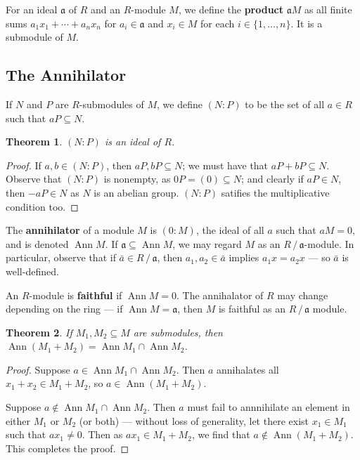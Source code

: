 \documentclass[11pt]{article}
\newtheorem{theorem}{Theorem}
\newcommand{\Ann}{\operatorname{Ann}}
\begin{document}
For an ideal $\mathfrak{a}$ of $R$ and an $R$-module $M$, we define the \textbf{product} $\mathfrak{a} M$ as all finite sums $a_{1}x_{1} + \cdots + a_{n}x_{n}$ for $a_{i} \in \mathfrak{a}$ and $x_{i} \in M$  for each $i \in \{ 1, \ldots, n \}$. It is a submodule of $M$.


\subsection{The Annihilator}

If $N$ and $P$ are $R$-submodules of $M$, we define $(N : P)$ to be the set of all $a \in R$ such that $aP \subseteq N$.

\newpage

\begin{adjustwidth}{0.5cm}{}
	\begin{theorem}
		$(N : P)$ is an ideal of $R$.
	\end{theorem}
	\begin{proof}
		If $a, b \in (N : P)$, then $aP, bP \subseteq N$; we must have that $aP + bP \subseteq N$. Observe that $(N : P)$ is nonempty, as $0P = (0) \subseteq N$; and clearly if $aP \in N$, then $-aP \in N$ as $N$ is an abelian group. $(N : P)$ satifies the multiplicative condition too.
	\end{proof}
\end{adjustwidth}

The \textbf{annihilator} of a module $M$ is $(0 : M)$, the ideal of all $a$ such that $aM = 0$, and is denoted $\Ann M$. If $\mathfrak{a} \subseteq \Ann M$, we may regard $M$ as an $R \, / \, \mathfrak{a}$-module. In particular, observe that if $\bar{a} \in R \, / \, \mathfrak{a}$, then $a_{1}, a_{2} \in \bar{a}$ implies $a_{1}x = a_{2}x$ --- so $\bar{a}$ is well-defined.

An $R$-module is \textbf{faithful} if $\Ann M = 0$. The annihalator of $R$ may change depending on the ring --- if $\Ann M = \mathfrak{a}$, then $M$ is faithful as an $R \, / \, \mathfrak{a}$ module.

\begin{adjustwidth}{0.5cm}{}
	\begin{theorem}
		If $M_{1}, M_{2} \subseteq M$ are submodules, then $\Ann(M_{1} + M_{2}) = \Ann M_{1} \cap \Ann M_{2}$.
	\end{theorem}
	\begin{proof}
		Suppose $a \in \Ann M_{1} \cap \Ann M_{2}$. Then $a$ annihalates all $x_{1} + x_{2} \in M_{1} + M_{2}$, so $a \in \Ann(M_{1} + M_{2})$.

		Suppose $a \notin \Ann M_{1} \cap \Ann M_{2} $. Then $a$ must fail to annnihilate an element in either $M_{1}$ or $M_{2}$ (or both) --- without loss of generality, let there exist $x_{1} \in M_{1}$ such that $ax_{1} \ne 0$. Then as $ax_{1} \in M_{1} + M_{2}$, we find that $a \notin \Ann(M_{1} + M_{2})$. This completes the proof.
	\end{proof}
\end{adjustwidth}
\end{document}
